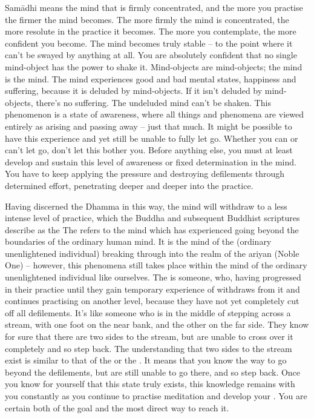 Sam\=adhi means the mind that is firmly concentrated, and the more you practise the firmer the mind becomes. The more firmly the mind is concentrated, the more resolute in the practice it becomes. The more you contemplate, the more confident you become. The mind becomes truly stable -- to the point where it can't be swayed by anything at all. You are absolutely confident that no single mind-object has the power to shake it. Mind-objects are mind-objects; the mind is the mind. The mind experiences good and bad mental states, happiness and suffering, because it is deluded by mind-objects. If it isn't deluded by mind-objects, there's no suffering. The undeluded mind can't be shaken. This phenomenon is a state of awareness, where all things and phenomena are viewed entirely as  arising and passing away -- just that much. It might be possible to have this experience and yet still be unable to fully let go. Whether you can or can't let go, don't let this bother you. Before anything else, you must at least develop and sustain this level of awareness or fixed determination in the mind. You have to keep applying the pressure and destroying defilements through determined effort, penetrating deeper and deeper into the practice.

Having discerned the Dhamma in this way, the mind will withdraw to a less intense level of practice, which the Buddha and subsequent Buddhist scriptures describe as the  The  refers to the mind which has experienced going beyond the boundaries of the ordinary human mind. It is the mind of the  (ordinary unenlightened individual) breaking through into the realm of the ariyan (Noble One) -- however, this phenomena still takes place within the mind of the ordinary unenlightened individual like ourselves. The  is someone, who, having progressed in their practice until they gain temporary experience of  withdraws from it and continues practising on another level, because they have not yet completely cut off all defilements. It's like someone who is in the middle of stepping across a stream, with one foot on the near bank, and the other on the far side. They know for sure that there are two sides to the stream, but are unable to cross over it completely and so step back. The understanding that two sides to the stream exist is similar to that of the  or the . It means that you know the way to go beyond the defilements, but are still unable to go there, and so step back. Once you know for yourself that this state truly exists, this knowledge remains with you constantly as you continue to practise meditation and develop your . You are certain both of the goal and the most direct way to reach it.

